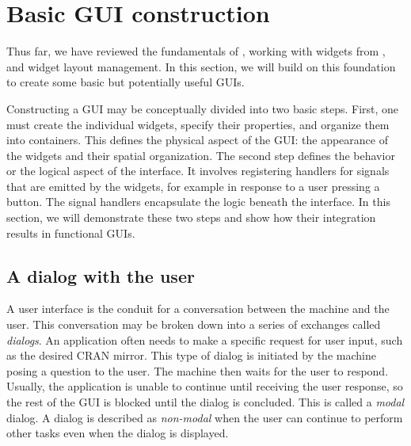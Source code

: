 \documentclass[article,shortnames]{jss}
\begin{document}

\section{Basic GUI construction}


Thus far, we have reviewed the fundamentals of , working
with
 widgets from , and widget layout management. In
this
section, we will build on this foundation to create some basic but
potentially
useful GUIs. 

Constructing a GUI may be conceptually divided into two basic steps.
First, one must create the individual widgets, specify their
properties,
and organize them into containers. This defines the physical aspect
of the GUI: the appearance of the widgets and their spatial
organization.
The second step defines the behavior or the logical aspect of the
interface. It involves registering handlers for signals that are
emitted
by the widgets, for example in response to a user pressing a button.
The signal handlers encapsulate the logic beneath the interface. In
this
section, we will demonstrate these two steps and show how their
integration
results in functional GUIs.

\subsection{A dialog with the user}\label{sec:dialog-example}

A user interface is the conduit for a conversation between the machine
and the user. This conversation may be broken down into a series of
exchanges called \emph{dialogs}. An application often needs to make a
specific request for user input, such as the desired CRAN mirror. This
type of dialog is initiated by the machine posing a question to the
user. The machine then waits for the user to respond. Usually, the
application is unable to continue until receiving the user response,
so the rest of the GUI is blocked until the dialog is concluded. This
is called a \emph{modal} dialog.  A dialog is described as
\emph{non-modal} when the user can continue to perform other tasks
even when the dialog is displayed.
\end{document}
